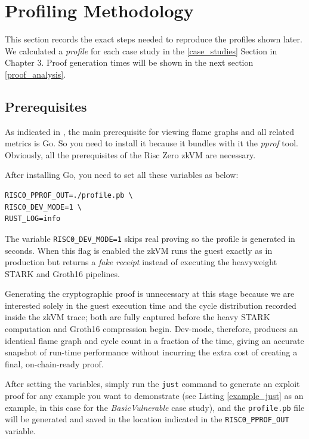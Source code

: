 \section{Profiling Methodology}
This section records the exact steps needed to reproduce the profiles shown later. We calculated a \textit{profile} for each case study in the \ref{case_studies} Section in Chapter 3. Proof generation times will be shown in the next section \ref{proof_analysis}.

\subsection{Prerequisites}  
As indicated in \cite{risc0_profiling}, the main prerequisite for viewing flame graphs and all related metrics is Go. So you need to install it because it bundles with it the \textit{pprof} tool. Obviously, all the prerequisites of the Risc Zero zkVM are necessary.

After installing Go, you need to set all these variables as below:

\begin{verbatim}
RISC0_PPROF_OUT=./profile.pb \
RISC0_DEV_MODE=1 \
RUST_LOG=info 
\end{verbatim}

The variable \texttt{RISC0\_DEV\_MODE=1} skips real proving so the profile is
generated in seconds\cite{risczero_dev_mode}. When this flag is enabled the zkVM runs the guest exactly as in production but returns a \emph{fake receipt} instead of executing the heavyweight STARK and Groth16 pipelines.

Generating the cryptographic proof is unnecessary at this stage because we are interested solely in the guest execution time and the cycle distribution recorded inside the zkVM trace; both are fully captured before the heavy STARK computation and Groth16 compression begin. Dev-mode, therefore, produces an identical flame graph and cycle count in a fraction of the time, giving an accurate snapshot of run-time performance without incurring the extra cost of creating a final, on-chain-ready proof.

After setting the variables, simply run the \texttt{just} command to generate an exploit proof for any example you want to demonstrate (see Listing \ref{example_just} as an example, in this case for the \textit{BasicVulnerable} case study), and the \texttt{profile.pb} file will be generated and saved in the location indicated in the \texttt{RISC0\_PPROF\_OUT} variable.

